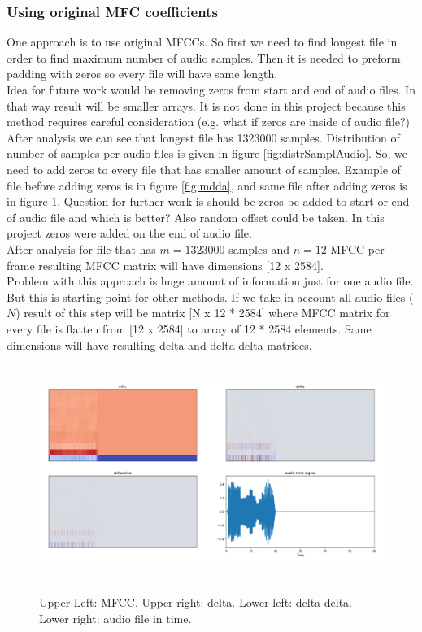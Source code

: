 \documentclass{article}
\begin{document}
\subsubsection{Using original MFC coefficients}
One approach is to use original MFCCs. So first we need to find longest file in order to find maximum number of audio 
samples. Then it is needed to preform padding with zeros so every file will have same length.\\
Idea for future work would be removing zeros from start and end of audio files. In that way result will be smaller 
arrays. It is not done in this project because this method requires careful consideration (e.g. what if zeros are inside of 
audio file?)\\
After analysis we can see that longest file has 1323000 samples. Distribution of number of samples per audio
files is given in figure \ref{fig:distrSamplAudio}. So, we need to add zeros to every file that has smaller amount
of samples. Example of file before adding zeros is in figure \ref{fig:mdda}, and same file after adding zeros is in figure 
\ref{fig:mddazeros}. Question for further work is should be zeros be added to start or end of audio file and which is better? Also random
offset could be taken. In this project zeros were added on the end of audio file. \\
After analysis for file that has $m=1323000$ samples and $n=12$ MFCC per frame resulting MFCC matrix will have dimensions [12 x 2584]. \\
Problem with this approach is huge amount of information just for one audio file. But this is starting point for other methods.
If we take in account all audio files ($N$) result of this step will be matrix [N x 12 * 2584] where MFCC matrix for every
file is flatten from [12 x 2584] to array of 12 * 2584 elements. Same dimensions will have resulting delta and delta delta matrices.\\

\begin{figure}[!htb]
\includegraphics[width=15cm, height=7cm]{mddazeros}\\
\caption{Upper Left: MFCC. Upper right: delta. Lower left: delta delta. Lower right: audio file in time.}
\label{fig:mddazeros}
\centering
\end{figure}
\end{document}
